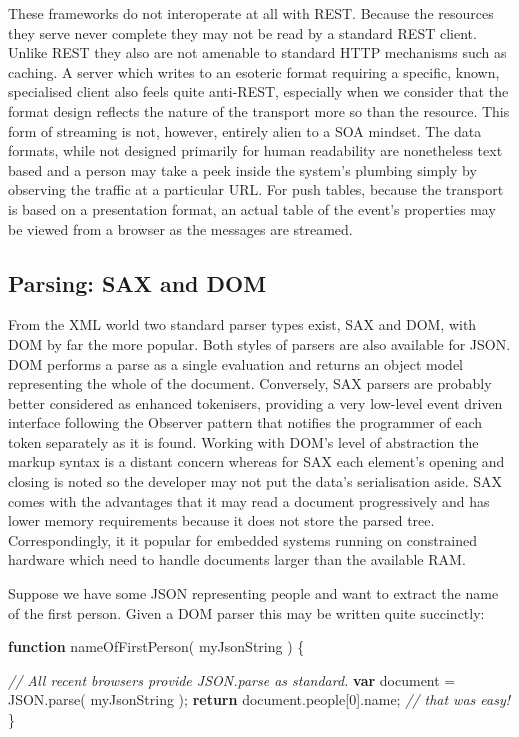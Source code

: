 \documentclass[12pt, ]{article}
\newenvironment{Shaded}{}{}
\newcommand{\KeywordTok}[1]{\textcolor[rgb]{0.00,0.44,0.13}{\textbf{{#1}}}}
\newcommand{\DecValTok}[1]{\textcolor[rgb]{0.25,0.63,0.44}{{#1}}}
\newcommand{\CommentTok}[1]{\textcolor[rgb]{0.38,0.63,0.69}{\textit{{#1}}}}
\newcommand{\OtherTok}[1]{\textcolor[rgb]{0.00,0.44,0.13}{{#1}}}
\newcommand{\FunctionTok}[1]{\textcolor[rgb]{0.02,0.16,0.49}{{#1}}}
\newcommand{\NormalTok}[1]{{#1}}
\begin{document}
These frameworks do not interoperate at all with REST. Because the
resources they serve never complete they may not be read by a standard
REST client. Unlike REST they also are not amenable to standard HTTP
mechanisms such as caching. A server which writes to an esoteric format
requiring a specific, known, specialised client also feels quite
anti-REST, especially when we consider that the format design reflects
the nature of the transport more so than the resource. This form of
streaming is not, however, entirely alien to a SOA mindset. The data
formats, while not designed primarily for human readability are
nonetheless text based and a person may take a peek inside the system's
plumbing simply by observing the traffic at a particular URL. For push
tables, because the transport is based on a presentation format, an
actual table of the event's properties may be viewed from a browser as
the messages are streamed.

\subsection{Parsing: SAX and DOM}\label{parsing-sax-and-dom}

From the XML world two standard parser types exist, SAX and DOM, with
DOM by far the more popular. Both styles of parsers are also available
for JSON. DOM performs a parse as a single evaluation and returns an
object model representing the whole of the document. Conversely, SAX
parsers are probably better considered as enhanced tokenisers, providing
a very low-level event driven interface following the Observer pattern
that notifies the programmer of each token separately as it is found.
Working with DOM's level of abstraction the markup syntax is a distant
concern whereas for SAX each element's opening and closing is noted so
the developer may not put the data's serialisation aside. SAX comes with
the advantages that it may read a document progressively and has lower
memory requirements because it does not store the parsed tree.
Correspondingly, it it popular for embedded systems running on
constrained hardware which need to handle documents larger than the
available RAM.

Suppose we have some JSON representing people and want to extract the
name of the first person. Given a DOM parser this may be written quite
succinctly:

\begin{Shaded}
\begin{Highlighting}[]
\KeywordTok{function} \FunctionTok{nameOfFirstPerson}\NormalTok{( myJsonString ) \{}

   \CommentTok{// All recent browsers provide JSON.parse as standard. }
   \KeywordTok{var} \NormalTok{document = }\OtherTok{JSON}\NormalTok{.}\FunctionTok{parse}\NormalTok{( myJsonString );}
   \KeywordTok{return} \OtherTok{document}\NormalTok{.}\FunctionTok{people}\NormalTok{[}\DecValTok{0}\NormalTok{].}\FunctionTok{name}\NormalTok{; }\CommentTok{// that was easy!}
\NormalTok{\}}
\end{Highlighting}
\end{Shaded}
\end{document}

